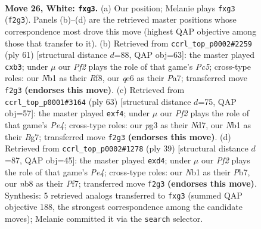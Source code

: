 \documentclass[11pt]{article}
\begin{document}
\clearpage

\begin{figure}[p]\centering
\begin{subfigure}{0.46\textwidth}\centering
\resizebox{\linewidth}{!}{%
\newchessgame
\chessboard[
  setfen={rnb1k1r1/8/4q3/p2p4/1p1B3R/6p1/PPPQ1PP1/RN4K1 w q - 0 26},
  showmover=false,
  pgfstyle=straightmove, color=movearrow, markmove={f2-g3}
]}
\caption{}
\end{subfigure}\hfill
\begin{subfigure}{0.46\textwidth}\centering
\resizebox{\linewidth}{!}{%
\newchessgame
\chessboard[
  setfen={5r1k/p2q2p1/6rp/5b2/2p2P2/PPR2Q1P/2P2B1K/4R3 b - - 0 31},
  showmover=false,
  pgfstyle=straightmove, color=movearrow, markmove={c4-b3}
]}
\caption{}
\end{subfigure}
\\[4pt]
\begin{subfigure}{0.46\textwidth}\centering
\resizebox{\linewidth}{!}{%
\newchessgame
\chessboard[
  setfen={6k1/3nqpb1/r7/pppPp1Pp/5P1N/1P5B/7K/3Q1R2 b - - 3 32},
  showmover=false,
  pgfstyle=straightmove, color=movearrow, markmove={e5-f4}
]}
\caption{}
\end{subfigure}\hfill
\begin{subfigure}{0.46\textwidth}\centering
\resizebox{\linewidth}{!}{%
\newchessgame
\chessboard[
  setfen={r1b2k2/pp3pq1/2n4p/3pp3/3P4/3BP2P/PP2N1P1/R2Q3K b - - 1 20},
  showmover=false,
  pgfstyle=straightmove, color=movearrow, markmove={e5-d4}
]}
\caption{}
\end{subfigure}
\caption{\textbf{Move 26, White: \texttt{fxg3}.} (a) Our position; Melanie plays \texttt{fxg3} (\texttt{f2g3}). Panels (b)--(d) are the retrieved master positions whose correspondence most drove this move (highest QAP objective among those that transfer to it). (b) Retrieved from \texttt{ccrl\_top\_p0002\#2259} (ply 61) [structural distance $d$=88, QAP obj=63]: the master played \texttt{cxb3}; under $\mu$ our \emph{Pf2} plays the role of that game's \emph{Pc5}; cross-type roles: our \emph{N}b1 as their \emph{R}f8, our \emph{q}e6 as their \emph{P}a7; transferred move \texttt{f2g3} \textbf{(endorses this move)}. (c) Retrieved from \texttt{ccrl\_top\_p0001\#3164} (ply 63) [structural distance $d$=75, QAP obj=57]: the master played \texttt{exf4}; under $\mu$ our \emph{Pf2} plays the role of that game's \emph{Pe4}; cross-type roles: our \emph{p}g3 as their \emph{N}d7, our \emph{N}b1 as their \emph{B}g7; transferred move \texttt{f2g3} \textbf{(endorses this move)}. (d) Retrieved from \texttt{ccrl\_top\_p0002\#1278} (ply 39) [structural distance $d$=87, QAP obj=45]: the master played \texttt{exd4}; under $\mu$ our \emph{Pf2} plays the role of that game's \emph{Pe4}; cross-type roles: our \emph{N}b1 as their \emph{P}b7, our \emph{n}b8 as their \emph{P}f7; transferred move \texttt{f2g3} \textbf{(endorses this move)}. Synthesis: 5 retrieved analogs transferred to \texttt{fxg3} (summed QAP objective 188, the strongest correspondence among the candidate moves); Melanie committed it via the \texttt{search} selector.}
\label{fig:thought-m50}
\end{figure}
\end{document}
